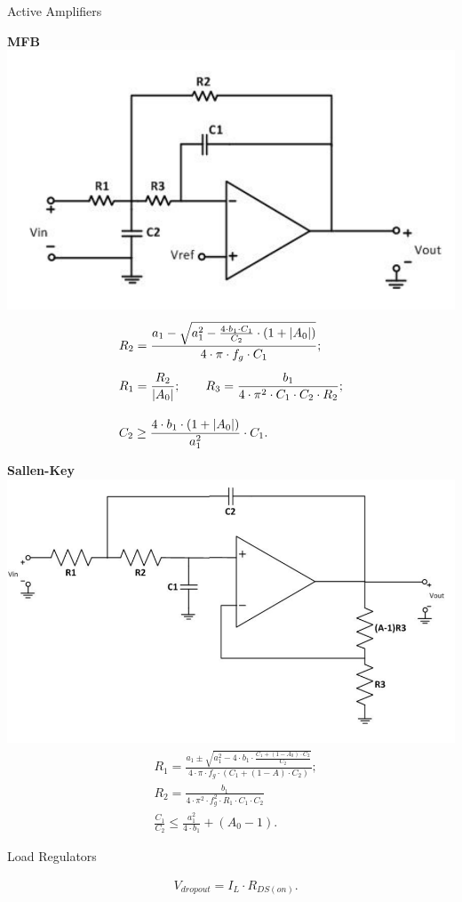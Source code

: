 \documentclass[11pt]{article}
\begin{document}
\begin{sectionbox}{Active Amplifiers}
\vspace{0.3em}
\begin{multicols}{2}
\centering \textbf{MFB} \\[0.7em]
\includegraphics[height=0.25\textwidth]{fig/MFB.png}
\begin{align*}
& R_2 = \frac{a_1 - \sqrt{a_1^2 - \frac{4 \cdot b_1 \cdot C_1}{C_2} \cdot (1 + \mathopen{}\left\lvert A_0\right\rvert)}}{4 \cdot \pi \cdot f_g \cdot C_1}; \\[0.5em]
& R_1 = \frac{R_2}{\mathopen{}\left\lvert A_0\right\rvert}; \qquad
  R_3 = \frac{b_1}{4 \cdot \pi^2 \cdot C_1 \cdot C_2 \cdot R_2}; \\[1em]
& C_2 \geq \frac{4 \cdot b_1 \cdot  (1 + \mathopen{}\left\lvert A_0\right\rvert)}{a_1^2} \cdot C_1.
\end{align*}

\columnbreak

\centering \textbf{Sallen-Key} \\[0.7em]
\includegraphics[height=0.25\textwidth]{fig/Sallen-Key.png}
\begin{align*}
& R_1 = \frac{a_1 \pm \sqrt{a_1^2 - 4 \cdot b_1 \cdot \frac{C_1 + (1 - A_0) \cdot C_2}{C_2}}}{4 \cdot \pi \cdot f_g \cdot (C_1 + (1 - A) \cdot C_2)}; \\[0.5em]
& R_2 = \frac{b_1}{4 \cdot \pi^2 \cdot f_g^2 \cdot R_1 \cdot C_1 \cdot C_2} \\[0.5em]
& \frac{C_1}{C_2} \leq \frac{a_1^2}{4 \cdot b_1} + (A_0 - 1).
\end{align*}
\end{multicols}

\vspace{-0.3em}
\end{sectionbox}

\begin{sectionbox}{Load Regulators}
  
\begin{align*}
& V_{dropout} = I_L \cdot R_{DS(on)}.
\end{align*}
\end{sectionbox}

\end{document}
